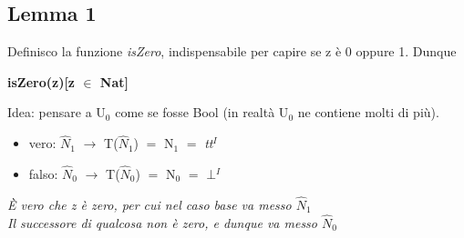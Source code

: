 \subsection{Lemma 1}
Definisco la funzione \textit{isZero}, indispensabile per capire se z \`e 0 oppure 1. Dunque\\
\begin{center}\textbf{isZero(z)[z $\in$ Nat]}\end{center}
Idea: pensare a U$_0$ come se fosse Bool (in realt\`a U$_0$ ne contiene molti di pi\`u).
\begin{itemize}
\item vero: $\hat{N}_1$ $\rightarrow$ T($\hat{N}_1$) $=$ N$_1$ $=$ \textit{tt}$^I$
\item falso: $\hat{N}_0$ $\rightarrow$ T($\hat{N}_0$) $=$ N$_0$ $=$ \textit{$\bot$}$^I$
\end{itemize}
\noindent
\textit{\`E vero che z \`e zero, per cui nel caso base va messo $\hat{N}_1$\\
Il successore di qualcosa non \`e zero, e dunque va messo $\hat{N}_0$}
\small
\begin{adjustwidth}{-4em}{}
\begin{prooftree}




\end{prooftree}
\end{adjustwidth}
\noindent
\normalsize

